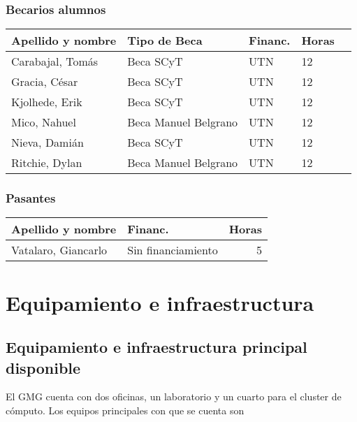 \documentclass[a4paper,11pt,twoside,final,titlepage,onecolumn,openright]{report}
\begin{document}
\subsubsection{Becarios alumnos}

\begin{tabular}{l l l l r}
\toprule
Apellido y nombre & Tipo de Beca & Financ. & Horas \\
\midrule
Carabajal, Tomás & Beca SCyT & UTN & 12 \\
Gracia, César & Beca SCyT & UTN & 12 \\
Kjolhede, Erik & Beca SCyT & UTN & 12 \\
Mico, Nahuel & Beca Manuel Belgrano & UTN & 12 \\
Nieva, Damián & Beca SCyT & UTN & 12 \\
Ritchie, Dylan & Beca Manuel Belgrano & UTN & 12 \\
\bottomrule 
\end{tabular}

 \subsubsection{Pasantes}
\begin{tabular}{l l r}
\toprule
Apellido y nombre & Financ. & Horas \\
\midrule
Vatalaro, Giancarlo & Sin financiamiento & 5\\
\bottomrule
\end{tabular}

\normalsize
\vspace{0.5cm}


\section{Equipamiento e infraestructura}

\subsection{Equipamiento e infraestructura principal disponible}

El GMG cuenta con dos oficinas, un laboratorio y un cuarto para el cluster de cómputo. Los equipos principales con que se cuenta son
\end{document}
